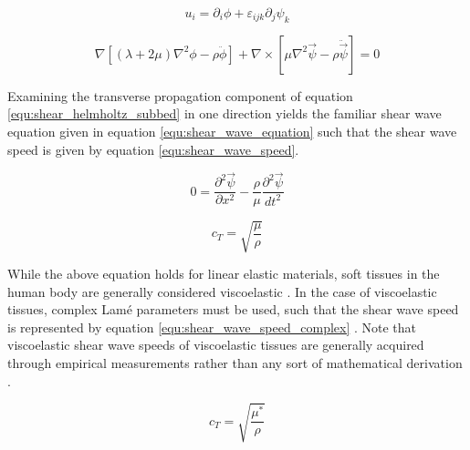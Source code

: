 			\begin{equation}
				\label{equ:shear_helmholtz_decomp}
				u_i = \partial_i \phi + \varepsilon_{ijk}\partial_j\psi_k
			\end{equation}

			\begin{equation}
				\label{equ:shear_helmholtz_subbed}
				\nabla\left[\left(\lambda + 2\mu\right) \nabla^2 \phi - \rho \ddot{\phi}\right] + \nabla \times \left[\mu \nabla^2 \vec{\psi} - \rho\ddot{\vec{\psi}}\right] = 0
			\end{equation}

			Examining the transverse propagation component of equation \ref{equ:shear_helmholtz_subbed} in one direction yields the familiar shear wave equation given in equation \ref{equ:shear_wave_equation} such that the shear wave speed is given by equation \ref{equ:shear_wave_speed}.

			\begin{equation}
				\label{equ:shear_wave_equation}
				0 = \frac{\partial^2 \vec{\psi}}{\partial x^2} - \frac{\rho}{\mu}\frac{\partial^2 \vec{\psi}}{dt^2}
			\end{equation}

			\begin{equation}
				\label{equ:shear_wave_speed}
				c_T = \sqrt{\frac{\mu}{\rho}}
			\end{equation}

			While the above equation holds for linear elastic materials, soft tissues in the human body are generally considered viscoelastic . In the case of viscoelastic tissues, complex Lam\'{e} parameters must be used, such that the shear wave speed is represented by equation \ref{equ:shear_wave_speed_complex} . Note that viscoelastic shear wave speeds of viscoelastic tissues are generally acquired through empirical measurements rather than any sort of mathematical derivation .

			\begin{equation}
				\label{equ:shear_wave_speed_complex}
				c_T = \sqrt{\frac{\mu^*}{\rho}}
			\end{equation}

